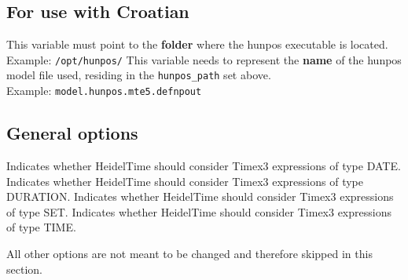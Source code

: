 \begin{itemize}
\subsection*{\textbf{For use with Croatian}}
This variable must point to the \textbf{folder} where the hunpos executable is located. \\
Example: \texttt{/opt/hunpos/}
This variable needs to represent the \textbf{name} of the hunpos model file used, residing in the \texttt{hunpos\_path} set above. \\
Example: \texttt{model.hunpos.mte5.defnpout}

\subsection*{\textbf{General options}}
Indicates whether HeidelTime should consider Timex3 expressions of type DATE.
Indicates whether HeidelTime should consider Timex3 expressions of type DURATION.
Indicates whether HeidelTime should consider Timex3 expressions of type SET.
Indicates whether HeidelTime should consider Timex3 expressions of type TIME.
\end{itemize}
All other options are not meant to be changed and therefore skipped in this section.
